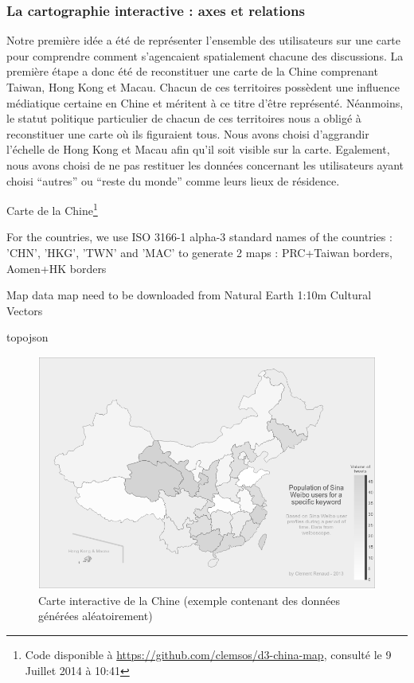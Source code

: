 \subsubsection{La cartographie interactive : axes et relations} %
\label{ssub:le_temps_et_la_carte}

    Notre première idée a été de représenter l{\textquoteright}ensemble des utilisateurs sur une carte pour comprendre comment s{\textquoteright}agencaient spatialement chacune des discussions. La première étape a donc été de reconstituer une carte de la Chine comprenant Taiwan, Hong Kong et Macau. Chacun de ces territoires possèdent une influence médiatique certaine en Chine et méritent à ce titre d{\textquoteright}être représenté. Néanmoins, le statut politique particulier de chacun de ces territoires nous a obligé à reconstituer une carte o\`u ils figuraient tous. Nous avons choisi d{\textquoteright}aggrandir l{\textquoteright}échelle de Hong Kong et Macau afin qu{\textquoteright}il soit visible sur la carte. Egalement, nous avons choisi de ne pas restituer les données concernant les utilisateurs ayant choisi {\textquotedblleft}autres{\textquotedblright} ou {\textquotedblleft}reste du monde{\textquotedblright} comme leurs lieux de résidence. 

    Carte de la Chine\footnote{Code disponible à \url{https://github.com/clemsos/d3-china-map}, consulté le 9 Juillet 2014 à 10:41}

    For the countries, we use ISO 3166-1 alpha-3 standard names of the countries : 'CHN', 'HKG', 'TWN' and 'MAC' to generate 2 maps : PRC+Taiwan borders, Aomen+HK borders

    Map data map need to be downloaded from Natural Earth 1:10m Cultural Vectors

    topojson 

    \begin{figure}
        \label{fig:ui-map}
        \centering
        \includegraphics[scale=0.4]{figures/chap4/ui/ui-map.png}
        \caption{Carte interactive de la Chine (exemple contenant des données générées aléatoirement)}
    \end{figure}


